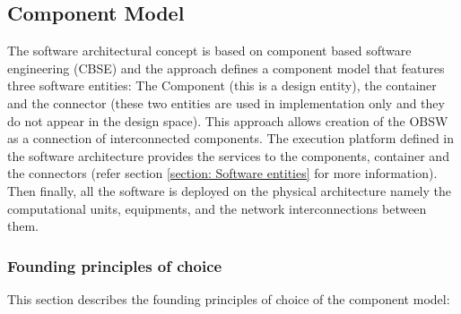 \subsection{Component Model}
The software architectural concept is based on component based software engineering (CBSE) and the approach defines a component model that features three software entities: The Component (this is a design entity), the container and the connector (these two entities are used in implementation only and they do not appear in the design space). This approach allows creation of the OBSW as a connection of interconnected components. The execution platform defined in the software architecture provides the services to the components, container and the connectors (refer section \cref{section: Software entities} for more information). Then finally, all the software is deployed on the physical architecture namely the computational units, equipments, and the network interconnections between them.

\subsubsection{Founding principles of choice}
This section describes the founding principles of choice of the component model:


